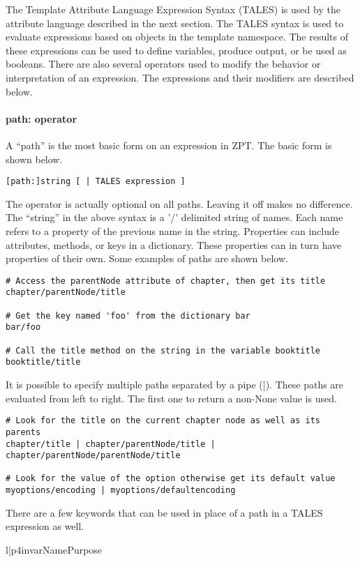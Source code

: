 The Template Attribute Language Expression Syntax (TALES) is used
by the attribute language described in the next section.  The TALES 
syntax is used to evaluate expressions based on objects in the
template namespace.  The results of these expressions can be used to
define variables, produce output, or be used as booleans.  There are
also several operators used to modify the behavior or interpretation
of an expression.  The expressions and their modifiers are described
below.

\paragraph{path: operator\label{sec:pathoperator}}

A ``path'' is the most basic form on an expression in ZPT.  The basic form
is shown below.
\begin{verbatim}
[path:]string [ | TALES expression ]
\end{verbatim}

The  operator is actually optional on all paths.  Leaving it
off makes no difference.  The ``string'' in the above syntax is a '/'
delimited string of names.  Each name refers to a property of the 
previous name in the string.  Properties can include attributes, methods,
or keys in a dictionary.  These properties can in turn have properties
of their own.  Some examples of paths are shown below.
\begin{verbatim}
# Access the parentNode attribute of chapter, then get its title
chapter/parentNode/title

# Get the key named 'foo' from the dictionary bar
bar/foo

# Call the title method on the string in the variable booktitle
booktitle/title
\end{verbatim}

It is possible to specify multiple paths separated by a pipe (|).
These paths are evaluated from left to right.  The first one to return
a non-None value is used.
\begin{verbatim}
# Look for the title on the current chapter node as well as its parents
chapter/title | chapter/parentNode/title | chapter/parentNode/parentNode/title

# Look for the value of the option otherwise get its default value
myoptions/encoding | myoptions/defaultencoding
\end{verbatim}

There are a few keywords that can be used in place of a path in a
TALES expression as well.
\begin{tableii}{l|p{4in}}{var}{Name}{Purpose}
\end{tableii}


